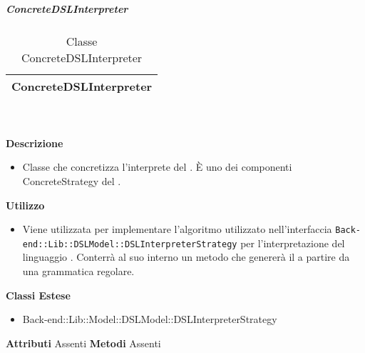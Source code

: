 			\subparagraph{ConcreteDSLInterpreter} 
\begin{table}[ht]
\begin{center}
\bgroup
	\setlength{\arrayrulewidth}{0.6mm}
	\def\arraystretch{1}
		\begin{tabular}{ | p{12cm} | }
				\hline  
					\centerline{\textbf{ConcreteDSLInterpreter}}
		\\ \hline 
				\hline
				\hline
		
		\end{tabular}
\egroup
\caption{Classe ConcreteDSLInterpreter}
\end{center}
\end{table} \textbf{\\ \\ Descrizione}
\begin{itemize}
\item[] Classe che concretizza l'interprete del . È uno dei componenti ConcreteStrategy del  .
\end{itemize} 
\textbf{Utilizzo}
\begin{itemize}
\item[] Viene utilizzata per implementare l'algoritmo utilizzato nell'interfaccia \texttt{Back-end::Lib::DSLModel::DSLInterpreterStrategy} per l'interpretazione del linguaggio . Conterrà al suo interno un metodo che genererà il  a partire da una grammatica regolare.
\end{itemize}
\textbf{Classi Estese}
\begin{itemize}
\item{Back-end::Lib::Model::DSLModel::DSLInterpreterStrategy}
\end{itemize}
\textbf{Attributi}
Assenti
\textbf{Metodi}
Assenti

